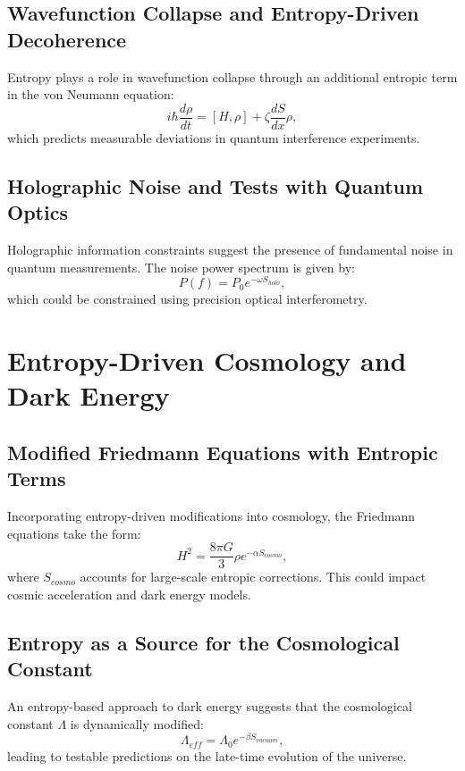 \documentclass{article}
\begin{document}
\subsection{Wavefunction Collapse and Entropy-Driven Decoherence}
Entropy plays a role in wavefunction collapse through an additional entropic term in the von Neumann equation:
\begin{equation}
i\hbar \frac{d\rho}{dt} = [H, \rho] + \zeta \frac{dS}{dx} \rho,
\end{equation}
which predicts measurable deviations in quantum interference experiments.

\subsection{Holographic Noise and Tests with Quantum Optics}
Holographic information constraints suggest the presence of fundamental noise in quantum measurements. The noise power spectrum is given by:
\begin{equation}
P(f) = P_0 e^{-\omega S_{holo}},
\end{equation}
which could be constrained using precision optical interferometry.

\section{Entropy-Driven Cosmology and Dark Energy}

\subsection{Modified Friedmann Equations with Entropic Terms}
Incorporating entropy-driven modifications into cosmology, the Friedmann equations take the form:
\begin{equation}
H^2 = \frac{8\pi G}{3} \rho e^{-\alpha S_{cosmo}},
\end{equation}
where $S_{cosmo}$ accounts for large-scale entropic corrections. This could impact cosmic acceleration and dark energy models.

\subsection{Entropy as a Source for the Cosmological Constant}
An entropy-based approach to dark energy suggests that the cosmological constant $\Lambda$ is dynamically modified:
\begin{equation}
\Lambda_{eff} = \Lambda_0 e^{-\beta S_{vacuum}},
\end{equation}
leading to testable predictions on the late-time evolution of the universe.
\end{document}
